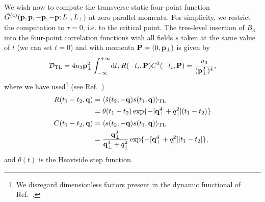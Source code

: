 \documentclass[12pt]{article}
\begin{document}
We wish now to compute the transverse static four-point function
$\tilde{G}^{(4)}({\bf p}, {\bf p}, -{\bf p}, -{\bf p}; L_\|,L_\bot) $
at zero parallel momenta. For simplicity, we restrict the computation to 
$\tau = 0$, i.e. to the critical point.
The tree-level insertion of $B_3$ into the four-point
correlation functions with all fields $s$ taken at the same value of
$t$ (we can set $t=0$) and with momenta ${\bf P} = (0,{\bf p}_\perp)$ is given by
\begin{equation}
{\mathcal D}_{\rm TL} = 4 u_3 {\bf p}^2_\perp \int_{-\infty}^{+\infty}\!{\rm d}
t_i\, R(-t_i,{\bf P})C^3(-t_i,{\bf P}) = \frac{u_3}{({\bf p}_\perp^2)^4},
\end{equation}
where we have used\footnote{We disregard dimensionless factors present in 
the dynamic functional of Ref.~\cite{Janssen86a}.
}
(see Ref.~\cite{Janssen86a}) 
\begin{align}
R(t_1-t_2,{\bf q})&=\langle\tilde{s}(t_2,-{\bf q}) s(t_1,{\bf q})\rangle_{\rm
 TL} \nonumber\\
&=\theta(t_1-t_2) \exp\{-[{\bf q}_\bot^4+q_\|^2](t_1-t_2)\}\\
C(t_1-t_2,{\bf q})&=\langle s(t_2,-{\bf q}) s(t_1,{\bf q})\rangle_{\rm
 TL} \nonumber\\
& =\frac{{\bf q}_\bot^2}{{\bf q}_\bot^4+q_\|^2}
    \exp\{-[{\bf q}_\bot^4+q_\|^2]|t_1-t_2|\},
\end{align}
and $\theta(t)$ is the Heaviside step function.
\end{document}
